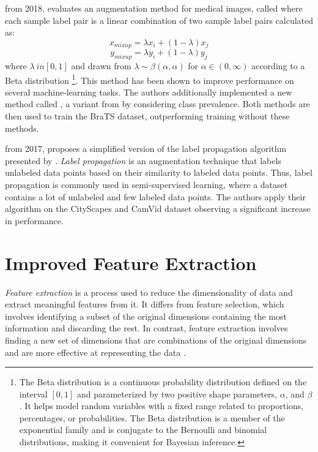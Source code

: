 \cite{EatonRosen2018ImprovingDA} from 2018, evaluates an augmentation method for medical images, called  where each sample label pair is a linear combination of two sample label pairs calculated as:
\begin{equation}
    x_{mixup}=\lambda x_i +(1-\lambda) x_j
\end{equation}
\begin{equation}
    y_{mixup}=\lambda y_i +(1-\lambda) y_j
\end{equation}
where $\lambda \ in [0,1]$ and drawn from $\lambda \sim \beta(\alpha,\alpha)$ for $\alpha \in (0,\infty)$ according to a Beta distribution \footnote{The Beta distribution is a continuous probability distribution defined on the interval $[0, 1]$ and parameterized by two positive shape parameters, $\alpha$, and $\beta$. It helps model random variables with a fixed range related to proportions, percentages, or probabilities. The Beta distribution is a member of the exponential family and is conjugate to the Bernoulli and binomial distributions, making it convenient for Bayesian inference.\cite{doi:10.1080/0266476042000214501}\cite{gelman2013bayesian}}. This method has been shown to improve performance on several machine-learning tasks. The authors additionally implemented a new method called , a variant from  by considering class prevalence. Both methods are then used to train the BraTS \cite{bakas2018identifying} dataset, outperforming training without these methods.

 \cite{Budvytis_2017_ICCV} from 2017, proposes a simplified version of the label propagation algorithm presented by \cite{budvytis2011semi}. \textit{Label propagation} is an augmentation technique that labels unlabeled data points based on their similarity to labeled data points. Thus, label propagation is commonly used in semi-supervised learning, where a dataset contains a lot of unlabeled and few labeled data points. The authors apply their algorithm on the CityScapes \cite{cordts2016cityscapes} and CamVid \cite{brostow2009semantic} dataset observing a significant increase in performance.

\section{Improved Feature Extraction}
\textit{Feature extraction} is a process used to reduce the dimensionality of data and extract meaningful features from it. It differs from feature selection, which involves identifying a subset of the original dimensions containing the most information and discarding the rest. In contrast, feature extraction involves finding a new set of dimensions that are combinations of the original dimensions and are more effective at representing the data \cite{alpaydin2020introduction}.

